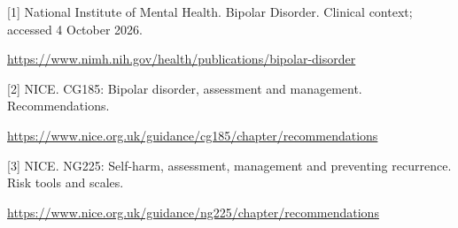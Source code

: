 \documentclass[10pt]{article}
\begin{document}
{\small [1] National Institute of Mental Health. Bipolar Disorder. Clinical context; accessed 4 October 2026.\par\url{https://www.nimh.nih.gov/health/publications/bipolar-disorder}\par}
{\small [2] NICE. CG185: Bipolar disorder, assessment and management. Recommendations.\par\url{https://www.nice.org.uk/guidance/cg185/chapter/recommendations}\par}
{\small [3] NICE. NG225: Self-harm, assessment, management and preventing recurrence. Risk tools and scales.\par\url{https://www.nice.org.uk/guidance/ng225/chapter/recommendations}\par}
\end{document}
